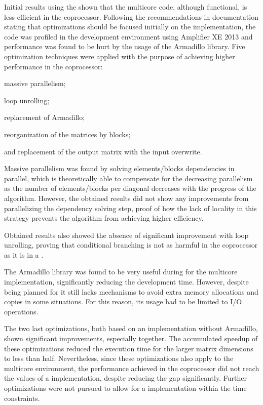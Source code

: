 \documentclass[../thesis]{subfiles}
\begin{document}
	Initial results using the \intel\xeonphi shown that the multicore code, although functional, is less efficient in the coprocessor. Following the recommendations in \intel documentation stating that optimizations should be focused initially on the \cpu implementation, the code was profiled in the development environment using \intel\vtune Amplifier XE 2013 and performance was found to be hurt by the usage of the Armadillo library. Five optimization techniques were applied with the purpose of achieving higher performance in the \intel\xeonphi coprocessor:
	\begin{inparaenum}[(a)]
		\item massive parallelism;
		\item loop unrolling;
		\item replacement of Armadillo;
		\item reorganization of the matrices by blocks;
		\item and replacement of the output matrix with the input overwrite.
	\end{inparaenum}

	Massive parallelism was found by solving elements/blocks dependencies in parallel, which is theoretically able to compensate for the decreasing parallelism as the number of elements/blocks per diagonal decreases with the progress of the algorithm. However, the obtained results did not show any improvements from parallelizing the dependency solving step, proof of how the lack of locality in this strategy prevents the algorithm from achieving higher efficiency. 

	Obtained results also showed the absence of significant improvement with loop unrolling, proving that conditional branching is not as harmful in the coprocessor as it is in a \gpu.

	The Armadillo library was found to be very useful during for the multicore implementation, significantly reducing the development time. However, despite being planned for \hpc it still lacks mechanisms to avoid extra memory allocations and copies in some situations. For this reason, its usage had to be limited to I/O operations.

	The two last optimizations, both based on an implementation without Armadillo, shown significant improvements, especially together. The accumulated speedup of these optimizations reduced the execution time for the larger matrix dimensions to less than half. Nevertheless, since these optimizations also apply to the multicore environment, the performance achieved in the coprocessor did not reach the values of a \cpu implementation, despite reducing the gap significantly. Further optimizations were not pursued to allow for a \cuda implementation within the time constraints.
\end{document}

